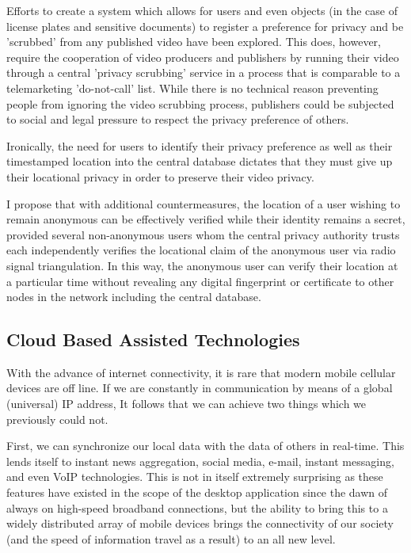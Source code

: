 \documentclass[a4paper,12pt]{report}
\begin{document}
Efforts to create a system which allows for users and even objects (in the case of license plates and sensitive documents) to register a preference for privacy and be 'scrubbed' from any published video have been explored. This does, however, require the cooperation of video producers and publishers by running their video through a central 'privacy scrubbing' service in a process that is comparable to a telemarketing 'do-not-call' list. While there is no technical reason preventing people from ignoring the video scrubbing process, publishers could be subjected to social and legal pressure to respect the privacy preference of others.

Ironically, the need for users to identify their privacy preference as well as their timestamped location into the central database dictates that they must give up their locational privacy in order to preserve their video privacy.
\cite{1420259}

I propose that with additional countermeasures, the location of a user wishing to remain anonymous can be effectively verified while their identity remains a secret, provided several non-anonymous users whom the central privacy authority trusts each independently verifies the locational claim of the anonymous user via radio signal triangulation. In this way, the anonymous user can verify their location at a particular time without revealing any digital fingerprint or certificate to other nodes in the network including the central database.
\subsection{Cloud Based Assisted Technologies}

With the advance of internet connectivity, it is rare that modern mobile cellular devices are off line. If we are constantly in communication by means of a global (universal) IP address, It follows that we can achieve two things which we previously could not. 

First, we can synchronize our local data with the data of others in real-time. This lends itself to instant news aggregation, social media, e-mail, instant messaging, and even VoIP technologies. This is not in itself extremely surprising as these features have existed in the scope of the desktop application since the dawn of always on high-speed broadband connections, but the ability to bring this to a widely distributed array of mobile devices brings the connectivity of our society (and the speed of information travel as a result) to an all new level.
\end{document}
